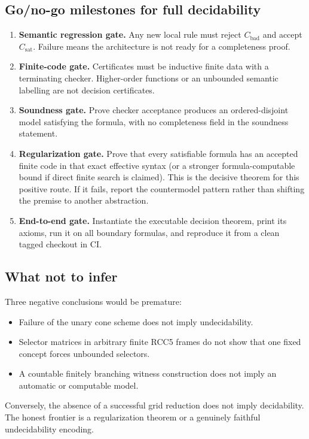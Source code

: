 \documentclass[11pt]{article}
\begin{document}
\subsection{Go/no-go milestones for full decidability}

\begin{enumerate}
  \item \textbf{Semantic regression gate.}  Any new local rule must reject
        \(C_{\mathrm{bad}}\) and accept \(C_{\mathrm{sat}}\).  Failure means the
        architecture is not ready for a completeness proof.
  \item \textbf{Finite-code gate.}  Certificates must be inductive finite data
        with a terminating checker.  Higher-order functions or an unbounded
        semantic labelling are not decision certificates.
  \item \textbf{Soundness gate.}  Prove checker acceptance produces an
        ordered-disjoint model satisfying the formula, with no completeness
        field in the soundness statement.
  \item \textbf{Regularization gate.}  Prove that every satisfiable formula has
        an accepted finite code in that exact effective syntax (or a stronger
        formula-computable bound if direct finite search is claimed).  This is
        the decisive theorem for this positive route.  If it fails, report the countermodel
        pattern rather than shifting the premise to another abstraction.
  \item \textbf{End-to-end gate.}  Instantiate the executable decision theorem,
        print its axioms, run it on all boundary formulas, and reproduce it from
        a clean tagged checkout in CI.
\end{enumerate}

\subsection{What not to infer}

Three negative conclusions would be premature:
\begin{itemize}
  \item Failure of the unary cone scheme does not imply undecidability.
  \item Selector matrices in arbitrary finite RCC5 frames do not show that one
        fixed concept forces unbounded selectors.
  \item A countable finitely branching witness construction does not imply an
        automatic or computable model.
\end{itemize}
Conversely, the absence of a successful grid reduction does not imply
decidability.  The honest frontier is a regularization theorem or a genuinely
faithful undecidability encoding.
\end{document}
